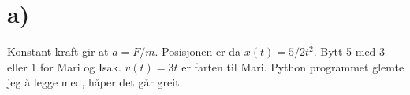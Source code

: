 

\pagebreak


\pagestyle{fancy}
\fancyhf{}

\renewcommand{\headrulewidth}{2pt}
\renewcommand{\footrulewidth}{1pt}

\section{a)}%

Konstant kraft gir at $a = F/m$. Posisjonen er da $x(t) = 5/2 t^2$.
Bytt 5 med 3 eller 1 for Mari og Isak. $v(t) = 3t$ er farten til Mari.
Python programmet glemte jeg å legge med, håper det går greit.

